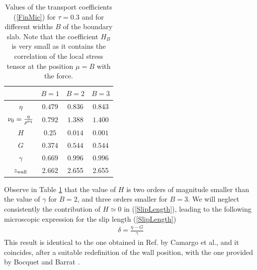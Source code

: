\documentclass[b5paper,openright,10pt]{book}
\begin{document}
\begin{table}[t]
  \centering
\begin{tabular}{|c|c|c|c|}
\hline
       & $B=1$                        & $B=2$ & $B=3$ \\
\hline
$\eta$  &  $0.479$   & $0.836$ & $0.843$ \\
$\nu_0=\frac{\eta}{\rho^{\rm eq}}$  &  $0.792$   & $1.388$ & $1.400$ \\
$H$  &  $0.25$   & $0.014$ & $0.001$\\
$G$  &  $0.374$   & $0.544$ & $0.544$\\
$\gamma$  &  $0.669$   & $0.996$ & $0.996$\\
$z_{\rm wall}$  &  2.662   & 2.655 & 2.655\\
\hline
\end{tabular}
\caption[Transport coefficients for different widths of the boundary slab]{Values of the transport coefficients (\ref{FinMic}) for $\tau=0.3$ and
  for  different  widths  $B$  of  the boundary  slab.   Note  that  the
  coefficient $H_B$ is very small as  it contains the correlation of the
  local stress tensor at the position $\mu=B$ with the force. }
\label{table}
\end{table}

Observe in  Table \ref{table} that the  value of $H$ is  two orders of
magnitude  smaller than  the value  of $\gamma$  for $B=2$,  and three
orders   smaller  for   $B=3$.  We   will  neglect   consistently  the
contribution  of  $H\simeq0$  in (\ref{SlipLength}),  leading  to  the
following microscopic expression for the slip length (\ref{SlipLength})
\begin{align}
 \delta=\frac{\eta-G}{\gamma}
\label{deltaBB}
\end{align}
  This result  is identical  to the  one
obtained in Ref.  \cite{CamargoBC2018} by Camargo et al., and it coincides, after a suitable redefinition of the wall position, with
the one provided by Bocquet and Barrat \cite{Bocquet1994}.
\end{document}
